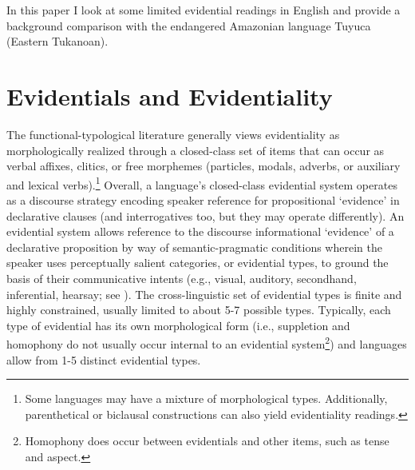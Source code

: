 \documentclass{article}
\begin{document}
In this paper I look at some limited evidential readings in English and provide a background comparison with the endangered Amazonian language Tuyuca (Eastern Tukanoan).   

\section{Evidentials and Evidentiality}%
The functional-typological literature generally views evidentiality as morphologically realized through a closed-class set of items that can occur as verbal affixes, clitics, or free morphemes (particles, modals, adverbs, or auxiliary and lexical verbs).\footnote{Some languages may have a mixture of morphological types. Additionally, parenthetical or biclausal constructions can also yield evidentiality readings.} Overall, a language's closed-class evidential system operates as a discourse strategy encoding speaker reference for propositional `evidence' in declarative clauses (and interrogatives too, but they may operate differently). An evidential system allows reference to the discourse informational `evidence' of a declarative proposition by way of semantic-pragmatic conditions wherein the speaker uses perceptually salient categories, or evidential types, to ground the basis of their communicative intents (e.g., visual, auditory, secondhand, inferential, hearsay; see ). The cross-linguistic set of evidential types is finite and highly constrained, usually limited to about 5-7 possible types.  Typically, each type of evidential has its own morphological form (i.e., suppletion and homophony do not usually occur internal to an evidential system\footnote{Homophony does occur between evidentials and other items, such as tense and aspect.}) and languages allow from 1-5 distinct evidential types. 
\end{document}
